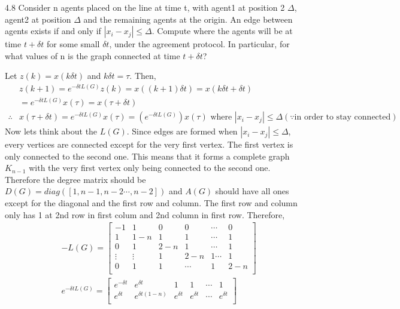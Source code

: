 \documentclass{article}
\begin{document}
\begin{problem} 4.8
    Consider n agents placed on the line at time t, with agent1 at position 2 $\Delta$, agent2 at position $\Delta$ and the remaining agents at the origin. An edge between agents exists if and only if $|x_i - x_j| \leq \Delta$. Compute where the agents will be at time $t + \delta t$ for some small $\delta t$, under the agreement protocol. In particular, for what values of n is the graph connected at time $t + \delta t$?

    Let $z(k) = x(k\delta t)$ and $k\delta t = \tau$. Then, 
    \begin{align*}
        &z(k + 1) = e^{-\delta t L(G)} z(k) = x((k+1)\delta t)=  x(k \delta t + \delta t)\\
        &=e^{-\delta t L(G)}  x(\tau) = x (\tau + \delta t)\\
        \therefore & x (\tau + \delta t) = e^{-\delta t L(G)}  x(\tau) = (e^{-\delta t L(G)} ) x(\tau) \text{ where } |x_i - x_j|\leq \Delta (\because \text{in order to stay connected})
    \end{align*}
    Now lets think about the $L(G)$. Since edges are formed when $|x_i - x_j| \leq \Delta$, every vertices are connected except for the very first vertex. The first vertex is only connected to the second one. This means that it forms a complete graph $K_{n-1}$ with the very first vertex only being connected to the second one. Therefore the degree matrix should be $D(G) = diag([1, n-1, n-2 \cdots , n-2])$ and $A(G)$ should have all ones except for the diagonal and the first row and column. The first row and column only has 1 at 2nd row in first colum and 2nd column in first row. Therefore, 
    \begin{align*}
        &-L(G) = \begin{bmatrix*}
            -1 & 1 & 0 & 0 & \cdots &0 \\
             1 & 1-n & 1 & 1 & \cdots & 1\\
             0 & 1 & 2-n & 1 & \cdots & 1 \\
             \vdots & \vdots & 1&2-n &1 \cdots &1\\
             0& 1&1&\cdots &1&2-n\\
        \end{bmatrix*}\\
        &e^{-\delta t L(G)} = \begin{bmatrix*}
            e^{-\delta t } & e^{\delta t } & 1 & 1 & \cdots &1 \\
            e^{\delta t } & e^{\delta t (1-n)} & e^{\delta t } & e^{\delta t } & \cdots & e^{\delta t }\\

\end{bmatrix*}
\end{align*}
\end{problem}
\end{document}
